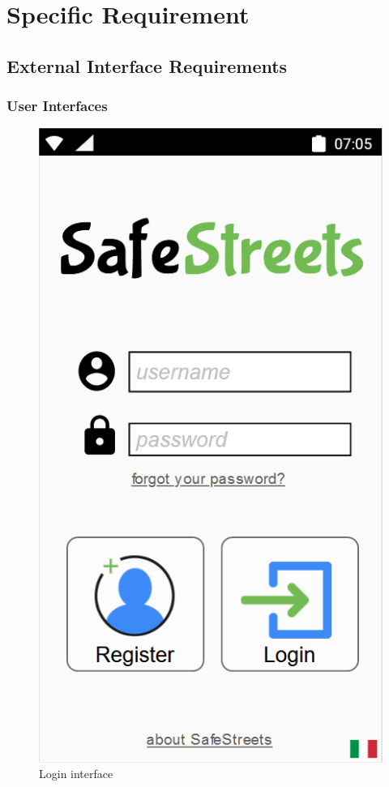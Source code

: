 \section{Specific Requirement}

\subsection{External Interface Requirements}

\subsubsection{User Interfaces}
    \begin{figure}[h]
        \centering
        \includegraphics[scale=0.5]{Images/login.png}
        \caption{Login interface}
    \end{figure}
